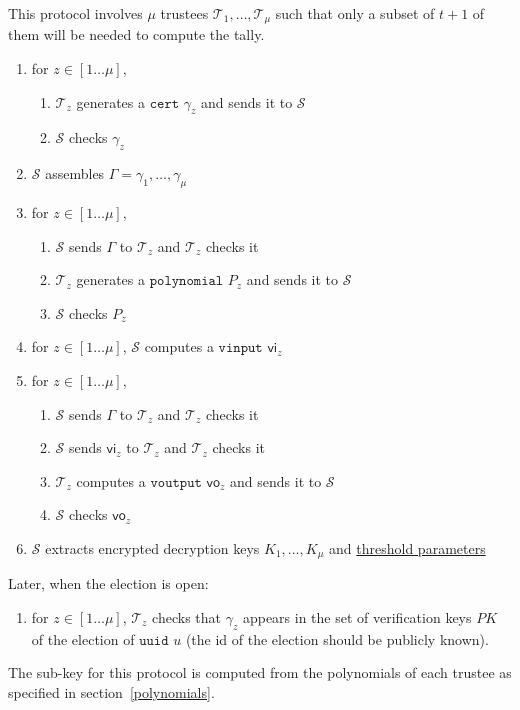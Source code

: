\documentclass[a4paper]{article}
\newcommand{\uuid}{\texttt{uuid}}
\newcommand{\cert}{\texttt{cert}}
\newcommand{\poly}{\texttt{polynomial}}
\newcommand{\vinput}{\texttt{vinput}}
\newcommand{\voutput}{\texttt{voutput}}
\begin{document}
This protocol involves $\mu$ trustees
$\mathcal{T}_1,\dots,\mathcal{T}_\mu$ such that only a subset of
$t+1$ of them will be needed to compute the tally.
\begin{enumerate}
\item for $z\in[1\dots \mu]$,
  \begin{enumerate}
  \item $\mathcal{T}_z$ generates a \hyperref[certificates]{$\cert$} $\gamma_z$
    and sends it to $\mathcal{S}$
  \item $\mathcal{S}$ checks $\gamma_z$
  \end{enumerate}
\item $\mathcal{S}$ assembles $\Gamma=\gamma_1,\dotsc,\gamma_\mu$
\item for $z\in[1\dots \mu]$,
  \begin{enumerate}
  \item $\mathcal{S}$ sends $\Gamma$ to $\mathcal{T}_z$ and $\mathcal{T}_z$ checks it
  \item $\mathcal{T}_z$ generates a \hyperref[polynomials]{$\poly$} $P_z$ and
    sends it to $\mathcal{S}$
  \item $\mathcal{S}$ checks $P_z$
  \end{enumerate}
\item for $z\in[1\dots \mu]$, $\mathcal{S}$ computes a
  \hyperref[vinputs]{$\vinput$} $\textsf{vi}_z$
\item for $z\in[1\dots \mu]$,
  \begin{enumerate}
  \item $\mathcal{S}$ sends $\Gamma$ to $\mathcal{T}_z$ and $\mathcal{T}_z$ checks it
  \item $\mathcal{S}$ sends $\textsf{vi}_z$ to $\mathcal{T}_z$ and $\mathcal{T}_z$ checks it
  \item $\mathcal{T}_z$ computes a \hyperref[voutputs]{$\voutput$} $\textsf{vo}_z$ and
    sends it to $\mathcal{S}$
  \item $\mathcal{S}$ checks $\textsf{vo}_z$
  \end{enumerate}
\item $\mathcal{S}$ extracts encrypted decryption keys $K_1,\dots,K_\mu$ and
  \hyperref[threshold-params]{threshold parameters}
\end{enumerate}
Later, when the election is open:
\begin{enumerate}
\item for $z\in[1\dots \mu]$, $\mathcal{T}_z$ checks that $\gamma_z$
  appears in the set of verification keys $PK$ of the election of {$\uuid$}
  $u$ (the id of the election should be publicly known).
\end{enumerate}
The sub-key for this protocol is computed from the polynomials of each
trustee as specified in section~\ref{polynomials}.
\end{document}
